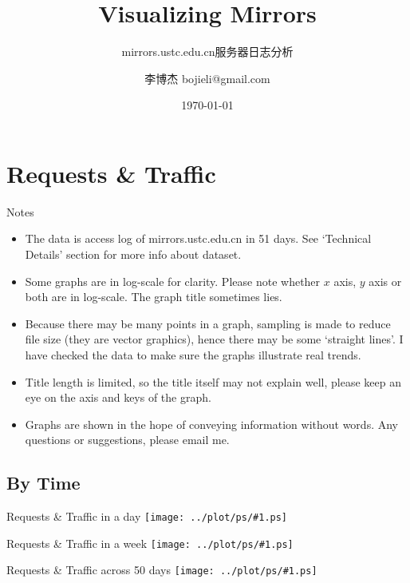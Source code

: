 \documentclass{beamer}
\newcommand\graph[1]{{\texttt{[image: ../plot/ps/\#1.ps]}}}
\begin{document}
\title{Visualizing Mirrors}
\subtitle{mirrors.ustc.edu.cn服务器日志分析}
\author{李博杰 bojieli@gmail.com}
\date{\today}
\frame{\titlepage}


\section{Requests \& Traffic}

\begin{frame}{Notes}
\begin{itemize}
  \item The data is access log of mirrors.ustc.edu.cn in 51 days. See `Technical Details' section for more info about dataset.
  \item Some graphs are in log-scale for clarity. Please note whether $x$ axis, $y$ axis or both are in log-scale. The graph title sometimes lies.
  \item Because there may be many points in a graph, sampling is made to reduce file size (they are vector graphics), hence there may be some `straight lines'. I have checked the data to make sure the graphs illustrate real trends.
  \item Title length is limited, so the title itself may not explain well, please keep an eye on the axis and keys of the graph.
  \item Graphs are shown in the hope of conveying information without words. Any questions or suggestions, please email me.
\end{itemize}
\end{frame}

\subsection{By Time}

\begin{frame}{Requests \& Traffic in a day}
\graph{req-daymin}
\end{frame}

\begin{frame}{Requests \& Traffic in a week}
\graph{req-weekday}
\end{frame}

\begin{frame}{Requests \& Traffic across 50 days}
\graph{req-days}
\end{frame}
\end{document}
